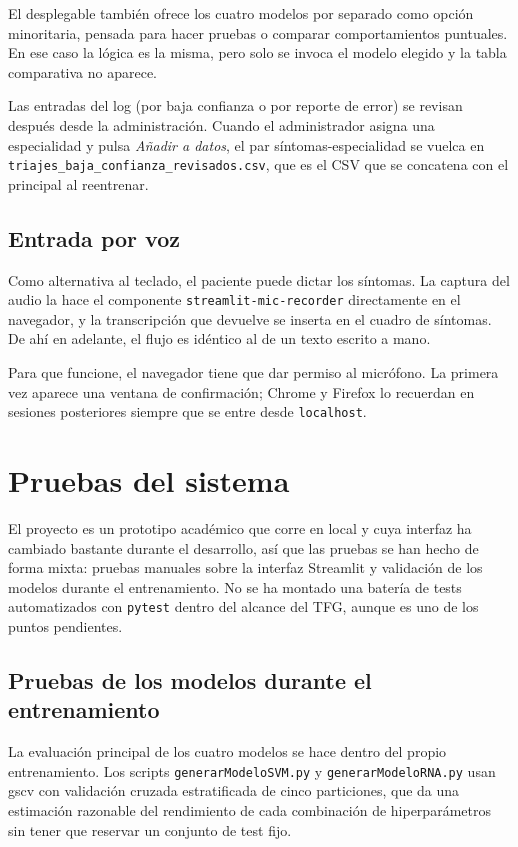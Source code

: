 El desplegable también ofrece los cuatro modelos por separado como opción minoritaria, pensada para hacer pruebas o comparar comportamientos puntuales. En ese caso la lógica es la misma, pero solo se invoca el modelo elegido y la tabla comparativa no aparece.

Las entradas del log (por baja confianza o por reporte de error) se revisan después desde la administración. Cuando el administrador asigna una especialidad y pulsa \textit{Añadir a datos}, el par síntomas-especialidad se vuelca en \texttt{triajes\_baja\_confianza\_revisados.csv}, que es el CSV que se concatena con el principal al reentrenar.

\subsection{Entrada por voz}

Como alternativa al teclado, el paciente puede dictar los síntomas. La captura del audio la hace el componente \texttt{streamlit-mic-recorder} \cite{streamlit_mic_recorder} directamente en el navegador, y la transcripción que devuelve se inserta en el cuadro de síntomas. De ahí en adelante, el flujo es idéntico al de un texto escrito a mano.

Para que funcione, el navegador tiene que dar permiso al micrófono. La primera vez aparece una ventana de confirmación; Chrome y Firefox lo recuerdan en sesiones posteriores siempre que se entre desde \texttt{localhost}.

\section{Pruebas del sistema}

El proyecto es un prototipo académico que corre en local y cuya interfaz ha cambiado bastante durante el desarrollo, así que las pruebas se han hecho de forma mixta: pruebas manuales sobre la interfaz Streamlit y validación de los modelos durante el entrenamiento. No se ha montado una batería de tests automatizados con \texttt{pytest} dentro del alcance del TFG, aunque es uno de los puntos pendientes.

\subsection{Pruebas de los modelos durante el entrenamiento}

La evaluación principal de los cuatro modelos se hace dentro del propio entrenamiento. Los scripts \texttt{generarModeloSVM.py} y \texttt{generarModeloRNA.py} usan \gls{gscv} con validación cruzada estratificada de cinco particiones, que da una estimación razonable del rendimiento de cada combinación de hiperparámetros sin tener que reservar un conjunto de test fijo.

